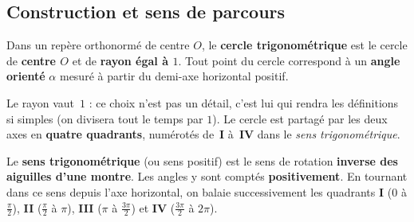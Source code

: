 \documentclass[11pt,a4paper]{article}
\begin{document}
\subsection{Construction et sens de parcours}

\begin{definition}
Dans un repère orthonormé de centre $O$, le \textbf{cercle trigonométrique} est le cercle de
\textbf{centre $O$} et de \textbf{rayon égal à $1$}. Tout point du cercle correspond à un
\textbf{angle orienté} $\alpha$ mesuré à partir du demi-axe horizontal positif.
\end{definition}

Le rayon vaut~$1$ : ce choix n'est pas un détail, c'est lui qui rendra les définitions si simples
(on divisera tout le temps par $1$). Le cercle est partagé par les deux axes en \textbf{quatre
quadrants}, numérotés de~\textbf{I} à~\textbf{IV} dans le \emph{sens trigonométrique}.

\begin{definition}
Le \textbf{sens trigonométrique} (ou sens positif) est le sens de rotation \textbf{inverse des
aiguilles d'une montre}. Les angles y sont comptés \textbf{positivement}. En tournant dans ce sens
depuis l'axe horizontal, on balaie successivement les quadrants \textbf{I} ($0$ à $\tfrac{\pi}{2}$),
\textbf{II} ($\tfrac{\pi}{2}$ à $\pi$), \textbf{III} ($\pi$ à $\tfrac{3\pi}{2}$) et
\textbf{IV} ($\tfrac{3\pi}{2}$ à $2\pi$).
\end{definition}
\end{document}
